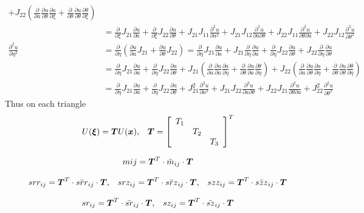 \documentclass{report}
\newcommand{\bm}[1]{\mbox{\boldmath $#1$}}
\newcommand{\pp}[2]{\frac{\partial{#1}}{\partial{#2}}}
\newcommand{\psp}[2]{\frac{\partial^2{#1}}{\partial{#2}^2}}
\newcommand{\ppp}[3]{\frac{\partial^2{#1}}{\partial{#2}\partial{#3}}}
\begin{document}
\begin{equation}
\begin{array}{ll}
                     + J_{22}(\pp{}{a}\pp{u}{\theta}\pp{a}{\xi}+\pp{}{\theta}\pp{u}{\theta}\pp{\theta}{\xi})
\\
                   & = \pp{}{\xi}J_{21}\pp{u}{a} + \pp{}{\xi}J_{22}\pp{u}{\theta} 
                     + J_{21}J_{11}\psp{u}{a}+J_{21}J_{12}\ppp{u}{a}{\theta}
                     + J_{22}J_{11}\ppp{u}{\theta}{a}+J_{22}J_{12}\psp{u}{\theta}
\\
\psp{u}{\eta} & = \pp{}{\eta}(\pp{u}{a} J_{21} + \pp{u}{\theta} J_{22})
              = \pp{}{\eta}J_{21}\pp{u}{a} + J_{21} \pp{}{\eta}\pp{u}{a} +
                \pp{}{\eta}J_{22}\pp{u}{\theta} + J_{22} \pp{}{\eta}\pp{u}{\theta}
\\
              & = \pp{}{\eta}J_{21}\pp{u}{a} + \pp{}{\eta}J_{22}\pp{u}{\theta} 
                + J_{21} (\pp{}{a}\pp{u}{a}\pp{a}{\eta}+\pp{}{\theta}\pp{u}{a}\pp{\theta}{\eta})
                + J_{22} (\pp{}{a}\pp{u}{\theta}\pp{a}{\eta}+\pp{}{\theta}\pp{u}{\theta}\pp{\theta}{\eta})
\\
              & = \pp{}{\eta}J_{21}\pp{u}{a} + \pp{}{\eta}J_{22}\pp{u}{\theta} 
                + J_{21}^2 \psp{u}{a} + J_{21}J_{22}\ppp{u}{a}{\theta}
                + J_{22}J_{21} \ppp{u}{\theta}{a} + J_{22}^2\psp{u}{\theta}
\end{array}
\end{equation}
Thus on each triangle
$$
U(\bm{\xi}) = \bm{T} U(\bm{x}),
\; \; \;
\bm{T}= \left[ \begin{array}{lll}
                  T_1 &    &     \\
                      &T_2 &     \\
                      &    & T_3 \\
               \end{array}
        \right]^T 
$$

$$
mij = \bm{T}^T \cdot \bar{m}_{ij} \cdot \bm{T}
$$

$$
srr_{ij} = \bm{T}^T \cdot \bar{srr}_{ij} \cdot \bm{T},
\; \; \;
srz_{ij} = \bm{T}^T \cdot \bar{srz}_{ij} \cdot \bm{T},
\; \; \;
szz_{ij} = \bm{T}^T \cdot \bar{szz}_{ij} \cdot \bm{T}
$$

$$
sr_{ij} = \bm{T}^T \cdot \bar{sr}_{ij} \cdot \bm{T},
\; \; \;
sz_{ij} = \bm{T}^T \cdot \bar{sz}_{ij} \cdot \bm{T}
$$



\end{document}
